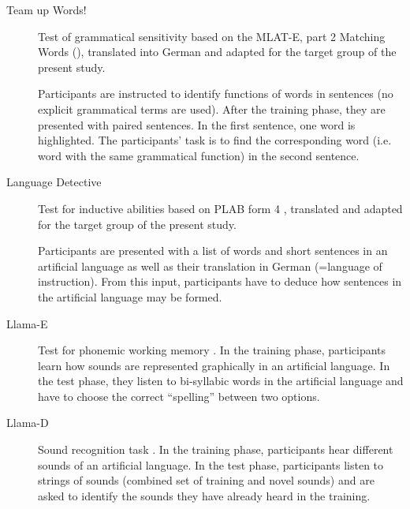 \documentclass[output=paper]{langsci/langscibook}
\begin{document}
\begin{description}
\item[Team up Words!] Test of grammatical sensitivity based on the MLAT-E, part 2 Matching Words (\citealt{CarrollSapon2010}), translated into German and adapted for the target group of the present study.

Participants are instructed to identify functions of words in sentences (no explicit grammatical terms are used). After the training phase, they are presented with paired sentences. In the first sentence, one word is highlighted. The participants’ task is to find the corresponding word (i.e. word with the same grammatical function) in the second sentence.

\item[Language Detective] Test for inductive abilities based on PLAB form 4 \citep{PimsleurEtAl2004}, translated and adapted for the target group of the present study.

Participants are presented with a list of words and short sentences in an artificial language as well as their translation in German (=language of instruction). From this input, participants have to deduce how sentences in the artificial language may be formed.

\item[Llama-E] Test for phonemic working memory \citep{MearaEtAl2001}. In the training phase, participants learn how sounds are represented graphically in an artificial language. In the test phase, they listen to bi-syllabic words in the artificial language and have to choose the correct “spelling” between two options.

\item[Llama-D] Sound recognition task \citep{MearaEtAl2001}. In the training phase, participants hear different sounds of an artificial language. In the test phase, participants listen to strings of sounds (combined set of training and novel sounds) and are asked to identify the sounds they have already heard in the training.
\end{description}
\end{document}
